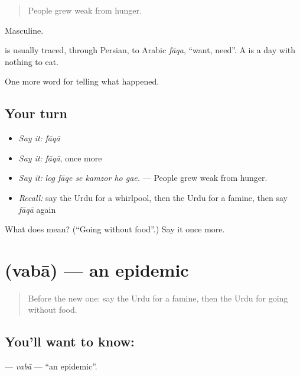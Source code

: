 \begin{quote}
People grew weak from hunger.
\end{quote}

Masculine.

\begin{cousinweb}
is usually traced, through Persian, to Arabic \emph{fāqa}, \textquotedblleft{}want, need\textquotedblright{}. A \textbf{} is a day with nothing to eat.
\end{cousinweb}

\begin{grammarlens}[title={What you've built}]
One more word for telling what happened.
\end{grammarlens}

\subsection*{Your turn}
\begin{itemize}
\raggedright
  \item \emph{Say it:} \emph{fāqā}
  \item \emph{Say it:} \emph{fāqā}, once more
  \item \emph{Say it:} \emph{log fāqe se kamzor ho gae.} — People grew weak from hunger.
  \item \emph{Recall:} say the Urdu for a whirlpool, then the Urdu for a famine, then say \emph{fāqā} again
\end{itemize}

\begin{tcolorbox}[breakable,colback=teal!4,colframe=teal!35!black,title={Before you move on}]
What does  mean? (\textquotedblleft{}Going without food\textquotedblright{}.) Say it once more.
\end{tcolorbox}
\section[\texorpdfstring{\ur{وبا} (vabā)}{وبا (vabā)}]{ (vabā) — an epidemic}

\label{lesson:UR-C294-vaba}



\begin{quote}
Before the new one: say the Urdu for a famine, then the Urdu for going without food.
\end{quote}

\subsection*{You'll want to know: }
\textbf{} — \emph{vabā} — \textquotedblleft{}an epidemic\textquotedblright{}.

